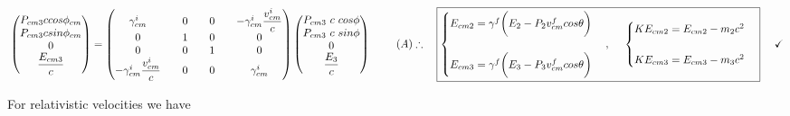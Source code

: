 \documentclass[fleqn]{article}
\begin{document}
$
  \\
  \\
  \begin{pmatrix}
    P_{cm3} c cos \phi_{cm}
    \\
    P_{cm3} c sin \phi_{cm}
    \\
    0
    \\
    \dfrac{E_{cm3}}{c}
  \end{pmatrix}=
  \begin{pmatrix}
    \gamma^i_{cm} && 0 && 0 && -\gamma^i_{cm} \dfrac{v^i_{cm}}{c}
    \\
    0 && 1 && 0 && 0
    \\
    0 && 0 && 1 && 0
    \\
    -\gamma^i_{cm} \dfrac{v^i_{cm}}{c} && 0 && 0 && \gamma^i_{cm}
  \end{pmatrix}
  \begin{pmatrix}
    P_{cm3} ~ c ~ cos \phi
    \\
    P_{cm3} ~ c ~ sin \phi
    \\
    0
    \\
    \dfrac{E_3}{c}
  \end{pmatrix} ~~~~~~~ (A)
  \\
  \\
  \\
  \therefore ~~~ \boxed{
    \begin{cases}
      E_{cm2}=\gamma^f \bigg( E_2-P_2 v^f_{cm} cos \theta  \bigg)
      \\
      \\
      E_{cm3}=\gamma^f \bigg( E_3-P_3 v^f_{cm} cos \theta  \bigg)
    \end{cases}, ~~~~
    \begin{cases}
      KE_{cm2}=E_{cm2}-m_2 c^2
      \\
      \\
      KE_{cm3}=E_{cm3}-m_3 c^2
    \end{cases}
  } ~~~~ \checkmark
  \\
  \\
$

For relativistic velocities we have
\end{document}

